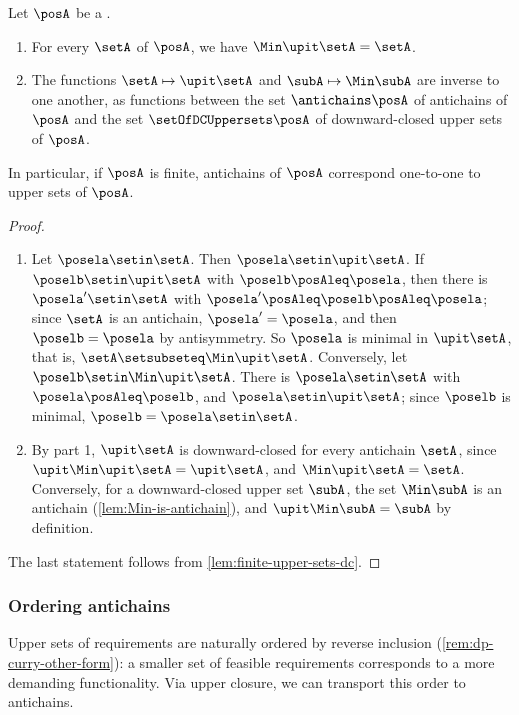 \begin{proposition}
    \label{prop:antichains-upper-sets}
    Let $\posA$ be a .
    \begin{enumerate}
        \item For every  $\setA$ of $\posA$, we have $\Min \upit \setA = \setA$.
        \item The functions $\setA \mapsto \upit \setA$ and $\subA \mapsto \Min \subA$ are inverse to one another, as functions between the set $\antichains \posA$ of antichains of $\posA$ and the set $\setOfDCUppersets \posA$ of downward-closed upper sets of $\posA$.
    \end{enumerate}
    In particular, if $\posA$ is finite, antichains of $\posA$ correspond one-to-one to upper sets of $\posA$.
\end{proposition}
\begin{proof}
    \begin{enumerate}
        \item Let $\posela \setin \setA$.
              Then $\posela \setin \upit \setA$.
              If $\poselb \setin \upit \setA$ with $\poselb \posAleq \posela$, then there is $\posela' \setin \setA$ with $\posela' \posAleq \poselb \posAleq \posela$; since $\setA$ is an antichain, $\posela' = \posela$, and then $\poselb = \posela$ by antisymmetry.
              So $\posela$ is minimal in $\upit \setA$, that is, $\setA \setsubseteq \Min \upit \setA$.
              Conversely, let $\poselb \setin \Min \upit \setA$.
              There is $\posela \setin \setA$ with $\posela \posAleq \poselb$, and $\posela \setin \upit \setA$; since $\poselb$ is minimal, $\poselb = \posela \setin \setA$.
        \item By part 1, $\upit \setA$ is downward-closed for every antichain $\setA$, since $\upit \Min \upit \setA = \upit \setA$, and $\Min \upit \setA = \setA$.
              Conversely, for a downward-closed upper set $\subA$, the set $\Min \subA$ is an antichain (\cref{lem:Min-is-antichain}), and $\upit \Min \subA = \subA$ by definition.
    \end{enumerate}
    The last statement follows from \cref{lem:finite-upper-sets-dc}.
\end{proof}

\subsubsection{Ordering antichains}

Upper sets of requirements are naturally ordered by reverse inclusion (\cref{rem:dp-curry-other-form}): a smaller set of feasible requirements corresponds to a more demanding functionality.
Via upper closure, we can transport this order to antichains.

